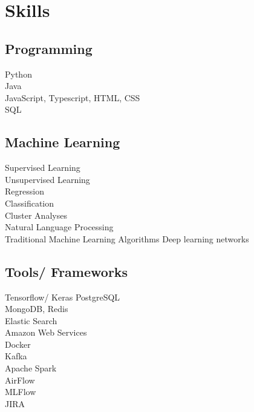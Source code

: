 \documentclass[letterpaper]{deedy-resume} %
\begin{document}
\begin{minipage}[t]{0.33\textwidth} %


\section{Skills}
\subsection{Programming}
Python \\
Java \\
JavaScript, Typescript, HTML, CSS\\
SQL \\

\sectionspace %

\subsection{Machine Learning}
Supervised Learning \\
Unsupervised Learning \\
Regression \\
Classification \\
Cluster Analyses \\
Natural Language Processing \\
Traditional Machine Learning Algorithms
Deep learning networks\\

\sectionspace %

\subsection{Tools/ Frameworks}
Tensorflow/ Keras
PostgreSQL \\
MongoDB, Redis \\
Elastic Search \\
Amazon Web Services \\
Docker \\
Kafka \\
Apache Spark\\
AirFlow \\
MLFlow \\
JIRA\\



\end{minipage}
\end{document}
